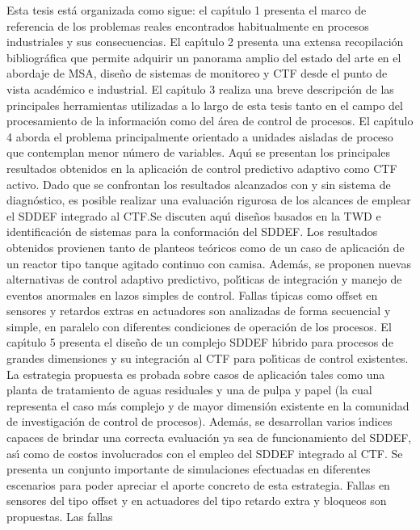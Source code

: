 Esta tesis est{\'a} organizada como sigue: el cap{\'\i}tulo 1 presenta el marco de referencia de los problemas reales
encontrados habitualmente en procesos industriales y sus consecuencias. El cap{\'\i}tulo 2 presenta una extensa
recopilaci{\'o}n bibliogr{\'a}fica que permite adquirir un panorama amplio del estado del arte en el abordaje de
MSA, dise{\~n}o de sistemas de monitoreo y CTF desde el punto de vista acad{\'e}mico e industrial. El cap{\'\i}tulo 3
realiza una breve descripci{\'o}n de las principales herramientas utilizadas a lo largo de esta tesis tanto en
el campo del procesamiento de la informaci{\'o}n como del {\'a}rea de control de procesos. El cap{\'\i}tulo 4 aborda el
problema principalmente orientado a unidades aisladas de proceso que contemplan menor n{\'u}mero de variables.
Aqu{\'\i} se presentan los principales resultados obtenidos en la aplicaci{\'o}n de control predictivo adaptivo como
CTF activo. Dado que se confrontan los resultados alcanzados con y sin sistema de diagn{\'o}stico, es posible
realizar una evaluaci{\'o}n rigurosa de los alcances de emplear el SDDEF integrado al CTF.Se discuten aqu{\'\i}
dise{\~n}os basados en la TWD e identificaci{\'o}n de sistemas para la conformaci{\'o}n del SDDEF. Los resultados
obtenidos provienen tanto de planteos te{\'o}ricos como de un caso de aplicaci{\'o}n de un reactor tipo tanque
agitado continuo con camisa. Adem{\'a}s, se proponen nuevas alternativas de control adaptivo predictivo,
pol{\'\i}ticas de integraci{\'o}n y manejo de eventos anormales en lazos simples de control. Fallas t{\'\i}picas como
offset en sensores y retardos extras en actuadores son analizadas de forma secuencial y simple, en paralelo
con diferentes condiciones de operaci{\'o}n de los procesos. El cap{\'\i}tulo 5 presenta el dise{\~n}o de un complejo
SDDEF h{\'\i}brido para procesos de grandes dimensiones y su integraci{\'o}n al CTF para pol{\'\i}ticas de control
existentes. La estrategia propuesta es probada sobre casos de aplicaci{\'o}n tales como una planta de
tratamiento de aguas residuales y una de pulpa y papel (la cual representa el caso m{\'a}s complejo y de mayor
dimensi{\'o}n existente en la comunidad de investigaci{\'o}n de control de procesos). Adem{\'a}s, se desarrollan varios
{\'\i}ndices capaces de brindar una correcta evaluaci{\'o}n ya sea de funcionamiento del SDDEF, as{\'\i} como de costos
involucrados con el empleo del SDDEF integrado al CTF. Se presenta un  conjunto importante de simulaciones
efectuadas en diferentes escenarios para poder apreciar el aporte concreto de esta estrategia. Fallas en
sensores del tipo offset y en actuadores del tipo retardo extra y bloqueos son propuestas. Las fallas
